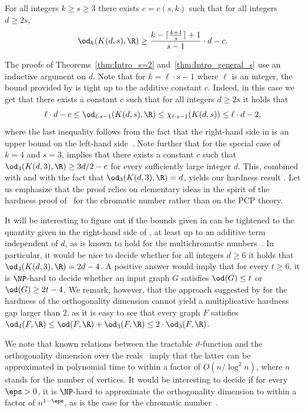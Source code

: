 \begin{theorem}\label{thm:Intro_general_s}
For %
all %
integers $k \geq s \geq 3$ there exists $c=c(s,k)$ such that for all integers $d \geq 2s$,
\[\od_{k}(K(d,s),\R) \geq \frac{k- \lceil \frac{k+1}{s} \rceil +1}{s-1} \cdot d-c.\]
\end{theorem}
%
%
%
%
\noindent
The proofs of Theorems~\ref{thm:Intro_s=2} and~\ref{thm:Intro_general_s} use an inductive argument on $d$.
Note that for $k = \ell \cdot s -1$ where $\ell$ is an integer, the bound provided by  is tight up to the additive constant $c$.
Indeed, in this case we get that there exists a constant $c$ such that for all integers $d \geq 2s$ it holds that
\[\ell \cdot d -c \leq \od_{\ell \cdot s-1}(K(d,s),\R) \leq \chi_{\ell \cdot s-1}(K(d,s)) \leq \ell \cdot d -2,\]
where the last inequality follows from the fact that the right-hand side in  is an upper bound on the left-hand side~\cite{Stahl76}.
Note further that for the special case of $k=4$ and $s=3$,  implies that there exists a constant $c$ such that $\od_4(K(d,3),\R) \geq 3d/2-c$ for every sufficiently large integer $d$. This, combined with  and with the fact that $\od_3(K(d,3),\R) = d$, yields our hardness result .
%
Let us emphasize that the proof relies on elementary ideas in the spirit of the hardness proof of~\cite{GareyJ76a} for the chromatic number rather than on the PCP theory.

It will be interesting to figure out if the bounds given in  can be tightened to the quantity given in the right-hand side of , at least up to an additive term independent of $d$, as is known to hold for the multichromatic numbers~\cite{Stahl98}.
%
%
%
%
%
%
In particular, it %
would  %
be nice to decide whether for all integers $d \geq 6$ it holds that $\od_4(K(d,3),\R) = 2d-4$.
A positive answer would imply that for every $t \geq 6$, it is $\NP$-hard to decide whether an input graph $G$ satisfies $\od(G) \leq t$ or $\od(G) \geq 2t-4$. We remark, however, that the approach suggested by  for the hardness of the orthogonality dimension cannot yield a multiplicative hardness gap larger than $2$, as it is easy to see that every graph $F$ satisfies $\od_4(F,\R) \leq \od(F,\R) + \od_3(F,\R) \leq 2 \cdot \od_3(F,\R)$.

We note that known relations between the tractable $\vartheta$-function and the orthogonality dimension over the reals~\cite{Lovasz79} imply that the latter can be approximated in polynomial time to within a factor of $O(n/\log^2 n)$, where $n$ stands for the number of vertices.
It would be interesting to decide if for %
%
every  %
$\eps >0$, it is $\NP$-hard to approximate the orthogonality dimension to within a factor of $n^{1-\eps}$, as is the case for the chromatic number~\cite{Zuckerman07}.

